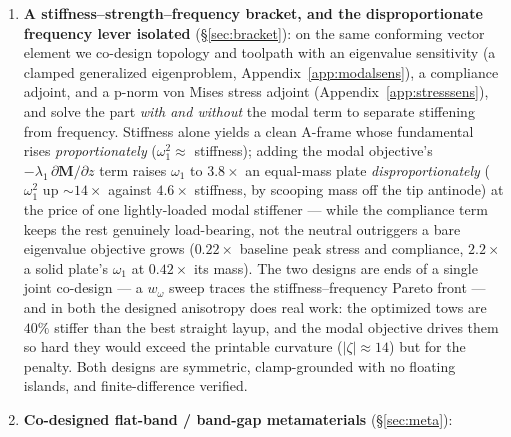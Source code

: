 \documentclass[11pt]{article}
\begin{document}
\begin{enumerate}
(\S\ref{sec:codesign}): a constant-strain-triangle plane-stress element carrying the
exact five-term $\mathbf D_f(\theta)$ decomposition (Appendix~\ref{app:fourier}) on a
\texttt{gmsh}/OCC mesh conforming to drilled holes --- the missing piece that puts
in-plane elasticity on the hole-conforming meshes previously reserved for scalar
problems --- used to \emph{shield} two protected regions from vibration entering at two corners
across a frequency band by fiber orientation alone. Because the holes are real
(traction-free), not soft density voids, the shielded field stays entirely in solid
material with provably zero energy in any void, so mass reduction and wave control
coexist rather than compete ($3$--$5\times$ quieter at every frequency, $24\%$
stiffer, $15\%$ lighter, printable curvature).
\item \textbf{A stiffness--strength--frequency bracket, and the disproportionate
frequency lever isolated} (\S\ref{sec:bracket}): on the same conforming vector element we
co-design topology and toolpath with an eigenvalue sensitivity (a clamped generalized
eigenproblem, Appendix~\ref{app:modalsens}), a compliance adjoint, and a p-norm von Mises
stress adjoint (Appendix~\ref{app:stresssens}), and solve the part \emph{with and without}
the modal term to separate stiffening from frequency. Stiffness alone yields a clean
A-frame whose fundamental rises \emph{proportionately} ($\omega_1^2\!\approx\!$ stiffness);
adding the modal objective's $-\lambda_1\,\partial\mathbf M/\partial z$ term raises
$\omega_1$ to $3.8\times$ an equal-mass plate \emph{disproportionately} ($\omega_1^2$ up
$\sim\!14\times$ against $4.6\times$ stiffness, by scooping mass off the tip antinode) at
the price of one lightly-loaded modal stiffener --- while the compliance term keeps the
rest genuinely load-bearing, not the neutral outriggers a bare eigenvalue objective grows
($0.22\times$ baseline peak stress and compliance, $2.2\times$ a solid plate's $\omega_1$
at $0.42\times$ its mass). The two designs are ends of a single joint co-design --- a
$w_\omega$ sweep traces the stiffness--frequency Pareto front --- and in both the designed
anisotropy does real work: the optimized tows are $40\%$ stiffer than the best straight
layup, and the modal objective drives them so hard they would exceed the printable
curvature ($|\zeta|\!\approx\!14$) but for the penalty. Both designs are symmetric,
clamp-grounded with no floating islands, and finite-difference verified.
\item \textbf{Co-designed flat-band / band-gap metamaterials} (\S\ref{sec:meta}):

\end{enumerate}
\end{document}

